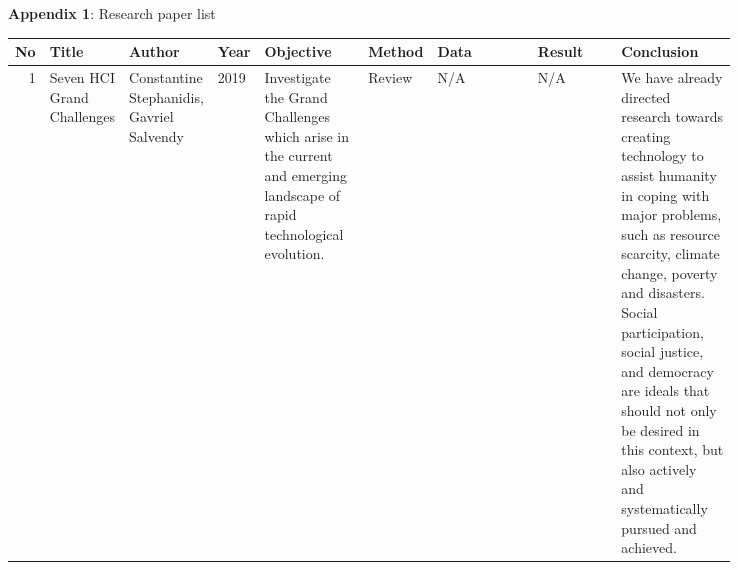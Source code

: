 \documentclass[
  11pt, %
]{assignment}
\begin{document}
\begin{landscape}
  \textbf{Appendix 1}: Research paper list
  \centering
  \fontsize{8}{9}\selectfont
  \begin{longtable}[l]{r | p{0.075\linewidth} p{0.08\linewidth} m{0.02\linewidth} p{0.15\linewidth} p{0.05\linewidth} p{0.17\linewidth} p{0.13\linewidth} p{0.17\linewidth}}
    \toprule
    No & Title                                                                                                                                                 & Author                                                                                                                      & Year & Objective                                                                                                                & Method             & Data                                                                                                                                   & Result                                                                                                                                                                      & Conclusion                                                                                                                                                                                                                                                                                                                                                   \\
    \midrule
    1  & Seven HCI Grand Challenges                                                                                                                            & Constantine Stephanidis, Gavriel Salvendy                                                                                   & 2019 & Investigate the Grand Challenges which arise in the current and emerging landscape of rapid technological evolution.     & Review             & N/A                                                                                                                                    & N/A                                                                                                                                                                         & We have already directed research towards creating technology to assist humanity in coping with major problems, such as resource scarcity, climate change, poverty and disasters. Social participation, social justice, and democracy are ideals that should not only be desired in this context, but also actively and systematically pursued and achieved. \\

\end{longtable}
\end{landscape}
\end{document}
